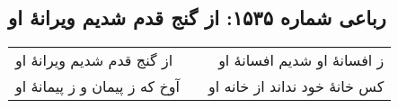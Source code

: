 \begin{center}
\section*{رباعی شماره ۱۵۳۵: از گنج قدم شدیم ویرانهٔ او}
\label{sec:1535}
\begin{longtable}{l p{0.5cm} r}
از گنج قدم شدیم ویرانهٔ او
&&
ز افسانهٔ او شدیم افسانهٔ او
\\
آوخ که ز پیمان و ز پیمانهٔ او
&&
کس خانهٔ خود نداند از خانه او
\\
\end{longtable}
\end{center}
